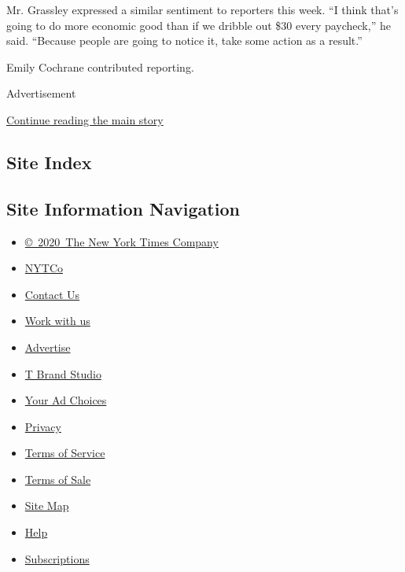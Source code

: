 Mr. Grassley expressed a similar sentiment to reporters this week. ``I
think that's going to do more economic good than if we dribble out \$30
every paycheck,'' he said. ``Because people are going to notice it, take
some action as a result.''

Emily Cochrane contributed reporting.

Advertisement

\protect\hyperlink{after-bottom}{Continue reading the main story}

\hypertarget{site-index}{%
\subsection{Site Index}\label{site-index}}

\hypertarget{site-information-navigation}{%
\subsection{Site Information
Navigation}\label{site-information-navigation}}

\begin{itemize}
\tightlist
\item
  \href{https://help.nytimes.com/hc/en-us/articles/115014792127-Copyright-notice}{©~2020~The
  New York Times Company}
\end{itemize}

\begin{itemize}
\tightlist
\item
  \href{https://www.nytco.com/}{NYTCo}
\item
  \href{https://help.nytimes.com/hc/en-us/articles/115015385887-Contact-Us}{Contact
  Us}
\item
  \href{https://www.nytco.com/careers/}{Work with us}
\item
  \href{https://nytmediakit.com/}{Advertise}
\item
  \href{http://www.tbrandstudio.com/}{T Brand Studio}
\item
  \href{https://www.nytimes.com/privacy/cookie-policy\#how-do-i-manage-trackers}{Your
  Ad Choices}
\item
  \href{https://www.nytimes.com/privacy}{Privacy}
\item
  \href{https://help.nytimes.com/hc/en-us/articles/115014893428-Terms-of-service}{Terms
  of Service}
\item
  \href{https://help.nytimes.com/hc/en-us/articles/115014893968-Terms-of-sale}{Terms
  of Sale}
\item
  \href{https://spiderbites.nytimes.com}{Site Map}
\item
  \href{https://help.nytimes.com/hc/en-us}{Help}
\item
  \href{https://www.nytimes.com/subscription?campaignId=37WXW}{Subscriptions}
\end{itemize}
